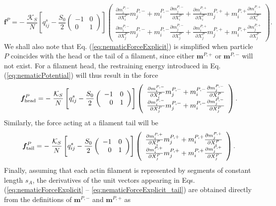 \begin{equation}\label{eq:nematicForceExplicit}
	\bm{f}^P = - \; \frac{\mathcal{K}_S}{N} \left[ {q}^s_{ij} - \frac{S_0}{2} \left(\begin{array}{rr}-1 & 0  \\0 & 1\end{array}\right) \right] \left(\begin{array}{c} \frac{\partial m_i^{P,-}}{\partial X_i^P} m_j^{P,-} + m_i^{P,-} \frac{\partial m_j^{P,-}}{\partial X_i^P} + \frac{\partial m_i^{P,+}}{\partial X_i^P} m_j^{P,+} + m_i^{P,+} \frac{\partial m_j^{P,+}}{\partial X_i^P} \\ \frac{\partial m_i^{P,-}}{\partial X_j^P} m_j^{P,-} + m_i^{P,-} \frac{\partial m_j^{P,-}}{\partial X_j^P} + \frac{\partial m_i^{P,+}}{\partial X_j^P} m_j^{P,+} + m_i^{P,+} \frac{\partial m_j^{P,+}}{\partial X_j^P} \end{array}\right).
\end{equation}
We shall also note that Eq. (\ref{eq:nematicForceExplicit}) is simplified when particle $P$ coincides with the head or the tail of a filament, since either $\bm{m}^{P,+}$ or $\bm{m}^{P,-}$ will not exist. For a filament head, the restraining energy introduced in Eq. (\ref{eq:nematicPotential}) will thus result in the force
\begin{equation}\label{eq:nematicForceExplicit_head}
	\bm{f}^{P}_{\rm head} = - \; \frac{\mathcal{K}_S}{N} \left[ {q}^s_{ij} - \frac{S_0}{2} \left(\begin{array}{rr}-1 & 0  \\0 & 1\end{array}\right) \right] \left(\begin{array}{c} \frac{\partial m_i^{P,-}}{\partial X_i^P} m_j^{P,-} + m_i^{P,-} \frac{\partial m_j^{P,-}}{\partial X_i^P} \\ \frac{\partial m_i^{P,-}}{\partial X_j^P} m_j^{P,-} + m_i^{P,-} \frac{\partial m_j^{P,-}}{\partial X_j^P} \end{array}\right).
\end{equation}
Similarly, the force acting at a filament tail will be
\begin{equation}\label{eq:nematicForceExplicit_tail}
	\bm{f}^P_{\rm tail} = - \; \frac{\mathcal{K}_S}{N} \left[ {q}^s_{ij} - \frac{S_0}{2} \left(\begin{array}{rr}-1 & 0  \\0 & 1\end{array}\right) \right] \left(\begin{array}{c} \frac{\partial m_i^{P,+}}{\partial X_i^P} m_j^{P,+} + m_i^{P,+} \frac{\partial m_j^{P,+}}{\partial X_i^P} \\ \frac{\partial m_i^{P,+}}{\partial X_j^P} m_j^{P,+} + m_i^{P,+} \frac{\partial m_j^{P,+}}{\partial X_j^P} \end{array}\right).
\end{equation}
Finally, assuming that each actin filament is represented by segments of constant length $s_A$, the derivatives of the unit vectors appearing in Eqs. (\ref{eq:nematicForceExplicit} -- \ref{eq:nematicForceExplicit_tail}) are obtained directly from the definitions of $\bm{m}^{P,-}$ and $\bm{m}^{P,+}$ as

